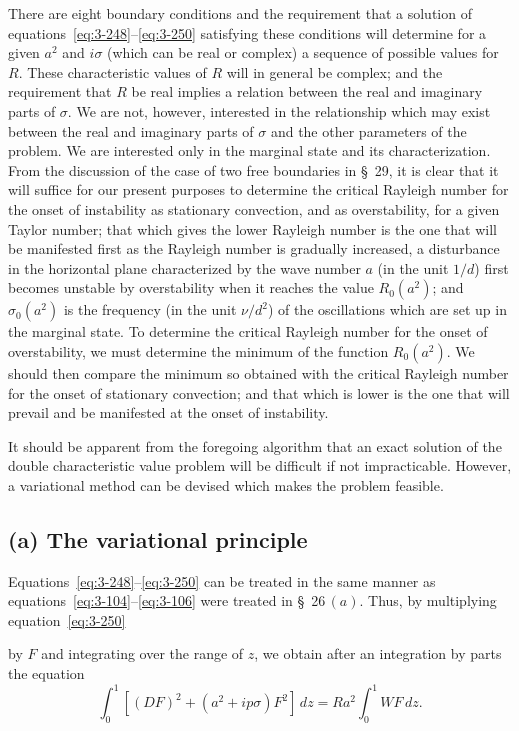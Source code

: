 There are eight boundary conditions and the requirement that a solution of equations~\eqref{eq:3-248}--\eqref{eq:3-250} satisfying these conditions will determine for a given $a^2$ and $i\sigma$ (which can be real or complex) a sequence of possible values for $R$. These characteristic values of $R$ will in general be complex; and the requirement that $R$ be real implies a relation between the real and imaginary parts of $\sigma$. We are not, however, interested in the relationship which may exist between the real and imaginary parts of $\sigma$ and the other parameters of the problem. We are interested only in the marginal state and its characterization. From the discussion of the case of two free boundaries in \S~29, it is clear that it will suffice for our present purposes to determine the critical Rayleigh number for the onset of instability as stationary convection, and as overstability, for a given Taylor number; that which gives the lower Rayleigh number is the one that will be manifested first as the Rayleigh number is gradually increased, a disturbance in the horizontal plane characterized by the wave number $a$ (in the unit $1/d$) first becomes unstable by overstability when it reaches the value $R_0(a^2)$; and $\sigma_0(a^2)$ is the frequency (in the unit $\nu/d^2$) of the oscillations which are set up in the marginal state. To determine the critical Rayleigh number for the onset of overstability, we must determine the minimum of the function $R_0(a^2)$. We should then compare the minimum so obtained with the critical Rayleigh number for the onset of stationary convection; and that which is lower is the one that will prevail and be manifested at the onset of instability.

It should be apparent from the foregoing algorithm that an exact solution of the double characteristic value problem will be difficult if not impracticable. However, a variational method can be devised which makes the problem feasible.

\subsection*{(a) The variational principle}

Equations~\eqref{eq:3-248}--\eqref{eq:3-250} can be treated in the same manner as equations~\eqref{eq:3-104}--\eqref{eq:3-106} were treated in \S~26\,$(a)$. Thus, by multiplying equation~\eqref{eq:3-250}

\noindent by $F$ and integrating over the range of $z$, we obtain after an integration by parts the equation
\begin{equation}\label{eq:3-253}
\int_0^1 [(DF)^2 + (a^2 + ip\sigma)F^2]\,dz = Ra^2 \int_0^1 WF\,dz.
\end{equation}

